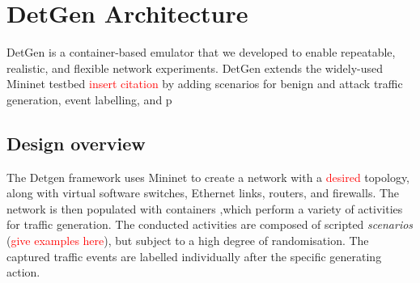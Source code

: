 \documentclass{article}
\begin{document}
%
%
%
%
%


\section{DetGen Architecture}

DetGen is a container-based emulator that we developed to enable repeatable, realistic, and flexible network experiments. DetGen extends the widely-used Mininet testbed \textcolor{red}{insert citation} by adding scenarios for benign and attack traffic generation, event labelling, and p


\subsection{Design overview}

The Detgen framework uses Mininet to create a network with a \textcolor{red}{desired} topology, along with virtual software switches, Ethernet links, routers, and firewalls. The network is then populated with containers ,which perform a variety of activities for traffic generation. The conducted activities are composed of scripted \textit{scenarios} (\textcolor{red}{give examples here}), but subject to a high degree of randomisation. The captured traffic events are labelled individually after the specific generating action. 
\end{document}
